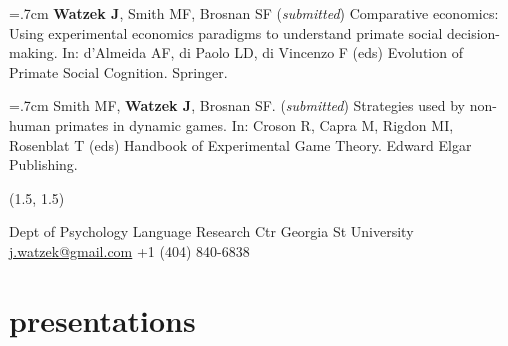 \documentclass[]{friggeri-cv}
\begin{document}

\hangindent=.7cm \textbf{Watzek J}, Smith MF, Brosnan SF (\emph{submitted}) Comparative economics: Using experimental economics paradigms to understand primate social decision-making. In: d'Almeida AF, di Paolo LD, di Vincenzo F (eds) Evolution of Primate Social Cognition. Springer.

\hangindent=.7cm Smith MF, \textbf{Watzek J}, Brosnan SF. (\emph{submitted}) Strategies used by non-human primates in dynamic games. In: Croson R, Capra M, Rigdon MI, Rosenblat T (eds) Handbook of Experimental Game Theory. Edward Elgar Publishing. \\[-.1cm]


\renewenvironment{aside}{%
  \let\oldsection\section
  \renewcommand{\section}[1]{
    \par\vspace{\baselineskip}{\Large\headingfont\color{headercolor} ##1}
  }
  \begin{textblock}{3.6}(1.5, 1.5)
  \begin{flushright}
  \obeycr
}{%
  \restorecr
  \end{flushright}
  \end{textblock}
  \let\section\oldsection
}


\begin{aside}
  \section{{\normalfont julia}watzek}
    Dept of Psychology
    Language Research Ctr
    Georgia St University
    ~
    \href{mailto:j.watzek@gmail.com}{j.watzek@gmail.com}
    +1 (404) 840-6838
\end{aside}


\section{presentations} ~\\[-1.3cm]
\end{document}
